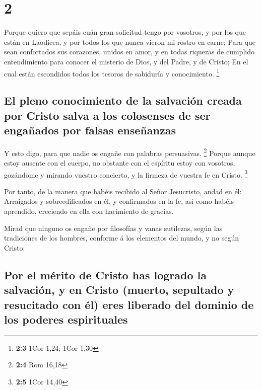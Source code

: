 \hypertarget{section-1}{%
\section{2}\label{section-1}}

 Porque quiero que sepáis cuán gran solicitud tengo por
vosotros, y por los que están en Laodicea, y por todos los que nunca
vieron mi rostro en carne;  Para que sean confortados sus
corazones, unidos en amor, y en todas riquezas de cumplido entendimiento
para conocer el misterio de Dios, y del Padre, y de Cristo;
 En el cual están escondidos todos los tesoros de
sabiduría y conocimiento. \footnote{\textbf{2:3} 1Cor 1,24; 1Cor 1,30}

\hypertarget{el-pleno-conocimiento-de-la-salvaciuxf3n-creada-por-cristo-salva-a-los-colosenses-de-ser-engauxf1ados-por-falsas-enseuxf1anzas}{%
\subsection{El pleno conocimiento de la salvación creada por Cristo
salva a los colosenses de ser engañados por falsas
enseñanzas}\label{el-pleno-conocimiento-de-la-salvaciuxf3n-creada-por-cristo-salva-a-los-colosenses-de-ser-engauxf1ados-por-falsas-enseuxf1anzas}}

 Y esto digo, para que nadie os engañe con palabras
persuasivas. \footnote{\textbf{2:4} Rom 16,18}  Porque
aunque estoy ausente con el cuerpo, no obstante con el espíritu estoy
con vosotros, gozándome y mirando vuestro concierto, y la firmeza de
vuestra fe en Cristo. \footnote{\textbf{2:5} 1Cor 14,40}

 Por tanto, de la manera que habéis recibido al Señor
Jesucristo, andad en él:  Arraigados y sobreedificados en
él, y confirmados en la fe, así como habéis aprendido, creciendo en ella
con hacimiento de gracias.

 Mirad que ninguno os engañe por filosofías y vanas
sutilezas, según las tradiciones de los hombres, conforme á los
elementos del mundo, y no según Cristo:

\hypertarget{por-el-muxe9rito-de-cristo-has-logrado-la-salvaciuxf3n-y-en-cristo-muerto-sepultado-y-resucitado-con-uxe9l-eres-liberado-del-dominio-de-los-poderes-espirituales}{%
\subsection{Por el mérito de Cristo has logrado la salvación, y en
Cristo (muerto, sepultado y resucitado con él) eres liberado del dominio
de los poderes
espirituales}\label{por-el-muxe9rito-de-cristo-has-logrado-la-salvaciuxf3n-y-en-cristo-muerto-sepultado-y-resucitado-con-uxe9l-eres-liberado-del-dominio-de-los-poderes-espirituales}}

